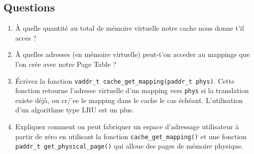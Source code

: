 \subsection*{Questions}

\begin{enumerate}
  \item \`A quelle quantit\'e au total de m\'emoire virtuelle notre cache nous
  donne t'il acces ?
  \item \`A quelles adresses (en m\'emoire virtuelle) peut-t'on acceder au mappings
  que l'on cr\'ee avec notre Page Table ?
  \item \'Ecrivez la fonction \verb+vaddr_t cache_get_mapping(paddr_t phys)+.
  Cette fonction retourne l'adresse virtuelle d'un mapping vers \verb+phys+
  si la translation existe d\'ej\`a, ou cr/'ee le mapping dans le cache le
  cas \'ech\'eant. L'utilisation d'un algorithme type LRU est un plus.
  \item Expliquez comment on peut fabriquer un espace d'adressage utilisateur
  \`a partir de z\'ero en utilisant la fonction \verb+cache_get_mapping()+ et
  une fonction \verb+paddr_t get_physical_page()+ qui alloue des pages de
  m\'emoire physique.
\end{enumerate}

